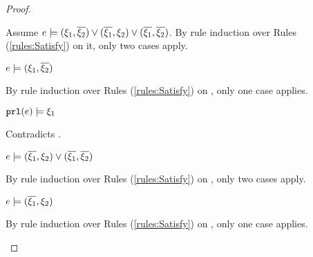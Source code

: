 \begin{proof}
\begin{byCases}
\begin{byCases}
\begin{byCases}
\begin{pfsteps*}
            \end{pfsteps*}
            Assume $e \models (\xi_1 , \overline{\xi_2}) \vee (\overline{\xi_1} , \xi_2) \vee (\overline{\xi_1} , \overline{\xi_2})$. By rule induction over Rules (\ref{rules:Satisfy}) on it, only two cases apply.
            \begin{byCases}
            \item[\text{(\ref{rule:CSOr1})}]
                \begin{pfsteps*}
                \item $e \models (\xi_1 , \overline{\xi_2})$  
                \end{pfsteps*}
                By rule induction over Rules (\ref{rules:Satisfy}) on , only one case applies.
                \begin{byCases}
                \item[\text{(\ref{rule:CSNotValPair})}]
                    \begin{pfsteps*}
                    \item $\mathtt{prl}(e) \models \xi_1$ 
                    \end{pfsteps*}
                    Contradicts .
                \end{byCases}
            \item[\text{(\ref{rule:CSOr2})}]
                \begin{pfsteps*}
                \item $e \models (\overline{\xi_1} , \xi_2) \vee (\overline{\xi_1} , \overline{\xi_2})$  
                \end{pfsteps*}
                By rule induction over Rules (\ref{rules:Satisfy}) on , only two cases apply.
                \begin{byCases}
                \item[\text{(\ref{rule:CSOr1})}]
                    \begin{pfsteps*}
                    \item $e \models (\overline{\xi_1} , \xi_2)$  
                    \end{pfsteps*}
                    By rule induction over Rules (\ref{rules:Satisfy}) on , only one case applies.

\end{byCases}
\end{byCases}
\end{byCases}
\end{byCases}
\end{byCases}
\end{proof}
